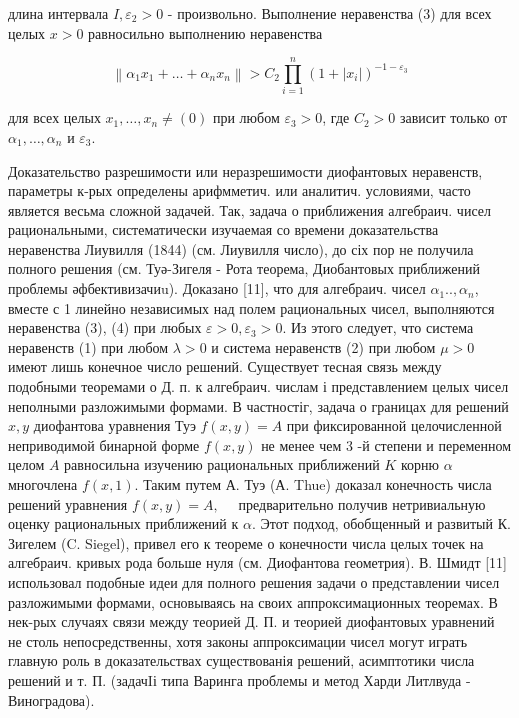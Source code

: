 \documentclass[10pt]{article}
\begin{document}
длина интервала $I, \varepsilon_{2}>0$ - произвольно. Выполнение неравенства (3) для всех целых $x>0$ равносильно выполнению неравенства



\[

\left\|\alpha_{1} x_{1}+\ldots+\alpha_{n} x_{n}\right\|>C_{2} \prod_{i=1}^{n}\left(1+\left|x_{i}\right|\right)^{-1-\varepsilon_{3}}

\]



для всех целых $x_{1}, \ldots, x_{n} \neq(0)$ при любом $\varepsilon_{3}>0$, где $C_{2}>0$ зависит только от $\alpha_{1}, \ldots, \alpha_{n}$ и $\varepsilon_{3}$.



Доказательство разрешимости или неразрешимости диофантовых неравенств, параметры к-рых определены арифмметич. или аналитич. условиями, часто является весьма сложной задачей. Так, задача о приближения алгебраич. чисел рациональными, систематически изучаемая со времени доказательства неравенства Лиувилля (1844) (см. Лиувилля число), до сіх пор не получила полного решения (см. Туә-Зигеля - Рота теорема, Диобантовых приближений проблемы әфбективизачиu). Доказано [11], что для алгебраич. чисел $\alpha_{1} . ., \alpha_{n}$, вместе с 1 линейно независимых над полем рациональных чисел, выполняются неравенства (3), (4) при любых $\varepsilon>0, \varepsilon_{3}>0$. Из этого следует, что система неравенств (1) при любом $\lambda>0$ и система неравенств (2) при любом $\mu>0$ имеют лишь конечное число решений. Существует тесная связь между подобными теоремами о Д. п. к алгебраич. числам і представлением целых чисел неполными разложимыми формами. В частностіг, задача о границах для решений $x, y$ диофантова уравнения Туэ $f(x, y)=A$ при фиксированной целочисленной неприводимой бинарной форме $f(x, y)$ не менее чем 3 -й степени и переменном целом $A$ равносильна изучению рациональных приближений $K$ корню $\alpha$ многочлена $f(x, 1)$. Таким путем А. Туэ (А. Thue) доказал конечность числа решений уравнения $f(x, y)=A, \quad$ предварительно получив нетривиальную оценку рациональных приближений к $\alpha$. Этот подход, обобщенный и развитый К. Зигелем (C. Siegel), привел его к теореме о конечности числа целых точек на алгебраич. кривых рода больше нуля (см. Диофантова геометрия). В. Шмидт [11] использовал подобные идеи для полного решения задачи о представлении чисел разложимыми формами, основываясь на своих аппроксимационных теоремах. В нек-рых случаях связи между теорией Д. П. и теорией диофантовых уравнений не столь непосредственны, хотя законы аппроксимации чисел могут играть главную роль в доказательствах существованія решений, асимптотики числа решений и т. П. (задачIі типа Варинга проблемы и метод Харди Литлвуда - Виноградова).
\end{document}
